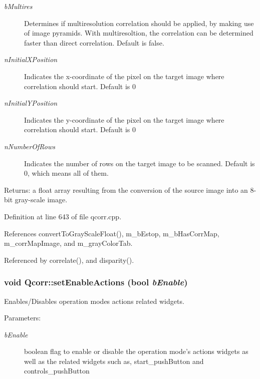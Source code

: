 \begin{Desc}
\begin{description}
\item[{\em bMultires}]Determines if multiresolution correlation should be applied, by making use of image pyramids. With multiresoltion, the correlation can be determined faster than direct correlation. Default is false. \item[{\em nInitialXPosition}]Indicates the x-coordinate of the pixel on the target image where correlation should start. Default is 0 \item[{\em nInitialYPosition}]Indicates the y-coordinate of the pixel on the target image where correlation should start. Default is 0 \item[{\em nNumberOfRows}]Indicates the number of rows on the target image to be scanned. Default is 0, which means all of them. \end{description}
\end{Desc}
\begin{Desc}
\item[Returns:]a float array resulting from the conversion of the source image into an 8-bit gray-scale image. \end{Desc}


Definition at line 643 of file qcorr.cpp.

References convertToGrayScaleFloat(), m\_\-bEstop, m\_\-bHasCorrMap, m\_\-corrMapImage, and m\_\-grayColorTab.

Referenced by correlate(), and disparity().\hypertarget{classQcorr_2de6d6969bdf48b225acc5ebbae063f7}{
\subsubsection[{setEnableActions}]{\setlength{\rightskip}{0pt plus 5cm}void Qcorr::setEnableActions (bool {\em bEnable})}}
\label{classQcorr_2de6d6969bdf48b225acc5ebbae063f7}


Enables/Disables operation modes actions related widgets. 

\begin{Desc}
\item[Parameters:]
\begin{description}
\item[{\em bEnable}]boolean flag to enable or disable the operation mode's actions widgets as well as the related widgets such as, start\_\-pushButton and controls\_\-pushButton \end{description}
\end{Desc}


